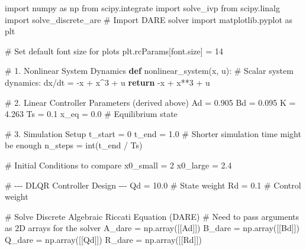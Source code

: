 \documentclass[
  letterpaper,
  DIV=11,
  numbers=noendperiod,
  oneside]{scrartcl}
\newenvironment{Shaded}{\begin{snugshade}}{\end{snugshade}}
\newcommand{\BuiltInTok}[1]{\textcolor[rgb]{0.00,0.23,0.31}{#1}}
\newcommand{\CommentTok}[1]{\textcolor[rgb]{0.37,0.37,0.37}{#1}}
\newcommand{\ControlFlowTok}[1]{\textcolor[rgb]{0.00,0.23,0.31}{\textbf{#1}}}
\newcommand{\DecValTok}[1]{\textcolor[rgb]{0.68,0.00,0.00}{#1}}
\newcommand{\FloatTok}[1]{\textcolor[rgb]{0.68,0.00,0.00}{#1}}
\newcommand{\ImportTok}[1]{\textcolor[rgb]{0.00,0.46,0.62}{#1}}
\newcommand{\KeywordTok}[1]{\textcolor[rgb]{0.00,0.23,0.31}{\textbf{#1}}}
\newcommand{\NormalTok}[1]{\textcolor[rgb]{0.00,0.23,0.31}{#1}}
\newcommand{\OperatorTok}[1]{\textcolor[rgb]{0.37,0.37,0.37}{#1}}
\newcommand{\StringTok}[1]{\textcolor[rgb]{0.13,0.47,0.30}{#1}}
\begin{document}
\begin{Shaded}
\begin{Highlighting}[numbers=left,,]
\ImportTok{import}\NormalTok{ numpy }\ImportTok{as}\NormalTok{ np}
\ImportTok{from}\NormalTok{ scipy.integrate }\ImportTok{import}\NormalTok{ solve\_ivp}
\ImportTok{from}\NormalTok{ scipy.linalg }\ImportTok{import}\NormalTok{ solve\_discrete\_are }\CommentTok{\# Import DARE solver}
\ImportTok{import}\NormalTok{ matplotlib.pyplot }\ImportTok{as}\NormalTok{ plt}

\CommentTok{\# Set default font size for plots}
\NormalTok{plt.rcParams[}\StringTok{\textquotesingle{}font.size\textquotesingle{}}\NormalTok{] }\OperatorTok{=} \DecValTok{14} 

\CommentTok{\# 1. Nonlinear System Dynamics}
\KeywordTok{def}\NormalTok{ nonlinear\_system(x, u):}
    \CommentTok{\# Scalar system dynamics: dx/dt = {-}x + x\^{}3 + u}
    \ControlFlowTok{return} \OperatorTok{{-}}\NormalTok{x }\OperatorTok{+}\NormalTok{ x}\OperatorTok{**}\DecValTok{3} \OperatorTok{+}\NormalTok{ u}

\CommentTok{\# 2. Linear Controller Parameters (derived above)}
\NormalTok{Ad }\OperatorTok{=} \FloatTok{0.905}
\NormalTok{Bd }\OperatorTok{=} \FloatTok{0.095}
\NormalTok{K }\OperatorTok{=} \FloatTok{4.263}
\NormalTok{Ts }\OperatorTok{=} \FloatTok{0.1}
\NormalTok{x\_eq }\OperatorTok{=} \FloatTok{0.0} \CommentTok{\# Equilibrium state}

\CommentTok{\# 3. Simulation Setup}
\NormalTok{t\_start }\OperatorTok{=} \DecValTok{0}
\NormalTok{t\_end }\OperatorTok{=} \FloatTok{1.0} \CommentTok{\# Shorter simulation time might be enough}
\NormalTok{n\_steps }\OperatorTok{=} \BuiltInTok{int}\NormalTok{(t\_end }\OperatorTok{/}\NormalTok{ Ts)}

\CommentTok{\# Initial Conditions to compare}
\NormalTok{x0\_small }\OperatorTok{=} \DecValTok{2}
\NormalTok{x0\_large }\OperatorTok{=} \FloatTok{2.4}

\CommentTok{\# {-}{-}{-} DLQR Controller Design {-}{-}{-}}
\NormalTok{Qd }\OperatorTok{=} \FloatTok{10.0}  \CommentTok{\# State weight}
\NormalTok{Rd }\OperatorTok{=} \FloatTok{0.1}  \CommentTok{\# Control weight}

\CommentTok{\# Solve Discrete Algebraic Riccati Equation (DARE)}
\CommentTok{\# Need to pass arguments as 2D arrays for the solver}
\NormalTok{A\_dare }\OperatorTok{=}\NormalTok{ np.array([[Ad]])}
\NormalTok{B\_dare }\OperatorTok{=}\NormalTok{ np.array([[Bd]])}
\NormalTok{Q\_dare }\OperatorTok{=}\NormalTok{ np.array([[Qd]])}
\NormalTok{R\_dare }\OperatorTok{=}\NormalTok{ np.array([[Rd]])}


\end{Highlighting}
\end{Shaded}
\end{document}
